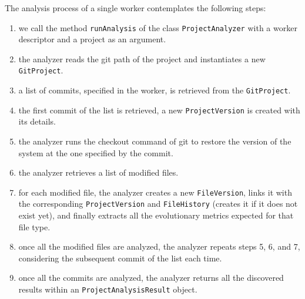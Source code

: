The analysis process of a single worker contemplates the following steps:
\begin{enumerate}
    \item we call the method \texttt{runAnalysis} of the class \texttt{ProjectAnalyzer} with a worker descriptor and a project as an argument. 
    \item the analyzer reads the git path of the project and instantiates a new \texttt{GitProject}. 
    \item a list of commits, specified in the worker, is retrieved from the \texttt{GitProject}.
    \item the first commit of the list is retrieved, a new \texttt{ProjectVersion} is created with its details. 
    \item the analyzer runs the checkout command of git to restore the version of the system at the one specified by the commit. 
    \item the analyzer retrieves a list of modified files. 
    \item for each modified file, the analyzer creates a new \texttt{FileVersion}, links it with the corresponding  \texttt{ProjectVersion} and \texttt{FileHistory} (creates it if it does not exist yet), and finally extracts all the evolutionary metrics expected for that file type.
    \item once all the modified files are analyzed, the analyzer repeats steps 5, 6, and 7, considering the subsequent commit of the list each time. 
    \item once all the commits are analyzed, the analyzer returns all the discovered results within an \texttt{ProjectAnalysisResult} object. 
\end{enumerate}


